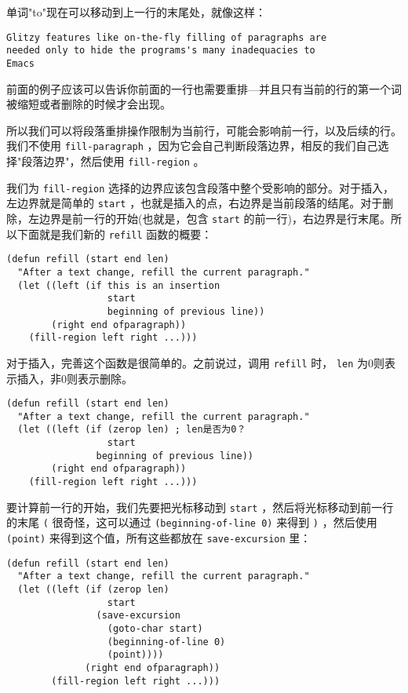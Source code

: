 单词"to"现在可以移动到上一行的末尾处，就像这样：

\begin{verbatim}
Glitzy features like on-the-fly filling of paragraphs are
needed only to hide the programs's many inadequacies to 
Emacs
\end{verbatim}

前面的例子应该可以告诉你前面的一行也需要重排---并且只有当前的行的第一个词被缩短或者删除的时候才会出现。

所以我们可以将段落重排操作限制为当前行，可能会影响前一行，以及后续的行。我们不使用 \texttt{fill-paragraph} ，因为它会自己判断段落边界，相反的我们自己选择"段落边界"，然后使用 \texttt{fill-region} 。

我们为 \texttt{fill-region} 选择的边界应该包含段落中整个受影响的部分。对于插入，左边界就是简单的 \texttt{start} ，也就是插入的点，右边界是当前段落的结尾。对于删除，左边界是前一行的开始(也就是，包含 \texttt{start} 的前一行)，右边界是行末尾。所以下面就是我们新的 \texttt{refill} 函数的概要：

\begin{verbatim}
(defun refill (start end len)
  "After a text change, refill the current paragraph."
  (let ((left (if this is an insertion
                  start
                  beginning of previous line))
        (right end ofparagraph))
    (fill-region left right ...)))
\end{verbatim}

对于插入，完善这个函数是很简单的。之前说过，调用 \texttt{refill} 时， \texttt{len} 为0则表示插入，非0则表示删除。

\begin{verbatim}
(defun refill (start end len)
  "After a text change, refill the current paragraph."
  (let ((left (if (zerop len) ; len是否为0？
                  start
                beginning of previous line))
        (right end ofparagraph))
    (fill-region left right ...)))
\end{verbatim}

要计算前一行的开始，我们先要把光标移动到 \texttt{start} ，然后将光标移动到前一行的末尾 \verb|(| 很奇怪，这可以通过 \texttt{(beginning-of-line 0)} 来得到 \verb|)| ，然后使用 \texttt{(point)} 来得到这个值，所有这些都放在 \texttt{save-excursion} 里：

\begin{verbatim}
(defun refill (start end len)
  "After a text change, refill the current paragraph."
  (let ((left (if (zerop len)
                  start
                (save-excursion
                  (goto-char start)
                  (beginning-of-line 0)
                  (point))))
              (right end ofparagraph))
        (fill-region left right ...)))
\end{verbatim}

